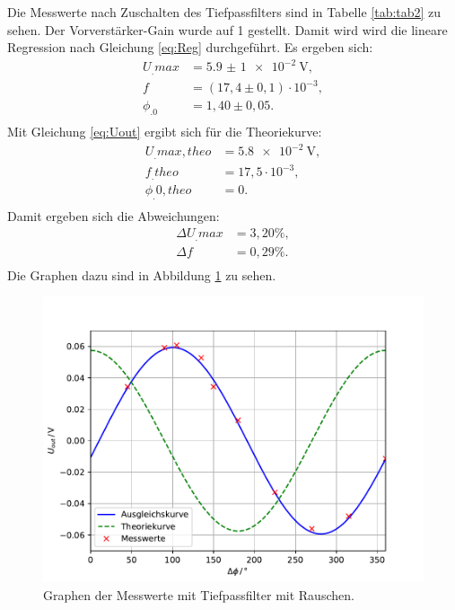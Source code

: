 \noindent Die Messwerte nach Zuschalten des Tiefpassfilters sind in Tabelle \ref{tab:tab2} zu sehen. Der Vorverstärker-Gain wurde auf 1 gestellt. Damit wird wird die lineare Regression nach Gleichung \eqref{eq:Reg} durchgeführt.
Es ergeben sich:
\begin{align*}
U_.{max} &= \SI{5,9(1)e-2}{\volt} ,\\
f 		 &= (17,4\pm0,1)\cdot 10^{-3} ,\\
\phi_.0  &= 1,40\pm0,05 \text{.}\\
\end{align*}
Mit Gleichung \eqref{eq:Uout} ergibt sich für die Theoriekurve:
\begin{align*}
U_.{max,theo} &= \SI{5,8e-2}{\volt} ,\\
f_.{theo}	  &= 17,5\cdot 10^{-3} ,\\
\phi_.{0,theo}&= 0 \text{.}\\
\end{align*}
Damit ergeben sich die Abweichungen:
\begin{align*}
\Delta U_.{max} &= 3,20\% ,\\
\Delta f		&= 0,29\% \text{.}\\
\end{align*}
Die Graphen dazu sind in Abbildung \ref{fig:U4} zu sehen.

\begin{figure}
\centering
\includegraphics[width=\linewidth-75pt,height=\textheight-75pt,keepaspectratio]{content/images/plot2.pdf}
\caption{Graphen der Messwerte mit Tiefpassfilter mit Rauschen.}\label{fig:U4}
\end{figure}


